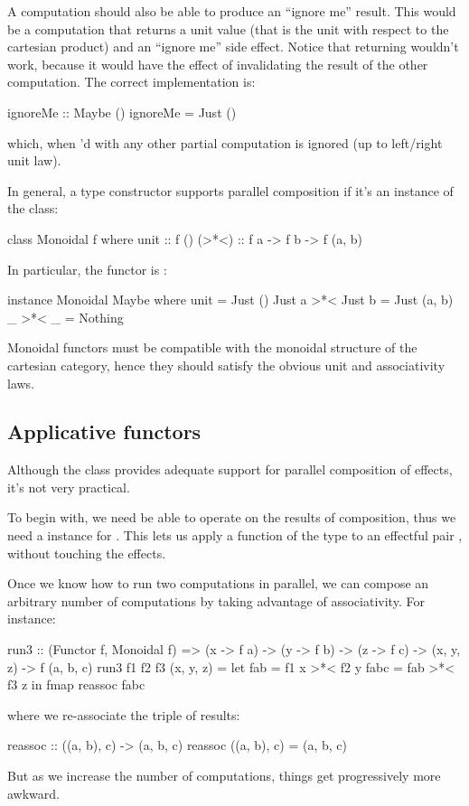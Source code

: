 \documentclass[DaoFP]{subfiles}
\begin{document}
A computation should also be able to produce an ``ignore me'' result. This would be a computation that returns a unit value (that is the unit with respect to the cartesian product) and an ``ignore me'' side effect. Notice that returning  wouldn't work, because it would have the effect of invalidating the result of the other computation. The correct implementation is:
\begin{haskell}
ignoreMe :: Maybe ()
ignoreMe = Just ()
\end{haskell}
which, when 'd with any other partial computation is ignored (up to left/right unit law).

In general, a type constructor  supports parallel composition if it's an instance of the  class:
\begin{haskell}
class Monoidal f where
  unit  :: f ()
  (>*<) :: f a -> f b -> f (a, b)
\end{haskell}
In particular, the  functor is :
\begin{haskell}
instance Monoidal Maybe where
  unit  = Just ()
  Just a >*< Just b = Just (a, b)
  _ >*< _ = Nothing
\end{haskell}
Monoidal functors must be compatible with the monoidal structure of the cartesian category, hence they should satisfy the obvious unit and associativity laws.

\subsection{Applicative functors}

Although the class  provides adequate support for parallel composition of effects, it's not very practical. 

To begin with, we need be able to operate on the results of composition, thus we need a  instance for . This lets us apply a function of the type  to an effectful pair , without touching the effects. 

Once we know how to run two computations in parallel, we can compose an arbitrary number of computations by taking advantage of associativity. For instance:
\begin{haskell}
run3 :: (Functor f, Monoidal f) => 
  (x -> f a) -> (y -> f b) -> (z -> f c) -> 
  (x, y, z) -> f (a, b, c)
run3 f1 f2 f3 (x, y, z) =
  let fab  = f1 x >*< f2 y
      fabc = fab >*< f3 z
  in fmap reassoc fabc
\end{haskell}
where we re-associate the triple of results:
\begin{haskell}
reassoc :: ((a, b), c) -> (a, b, c)
reassoc ((a, b), c) = (a, b, c)
\end{haskell}
But as we increase the number of computations, things get progressively more awkward. 
\end{document}
